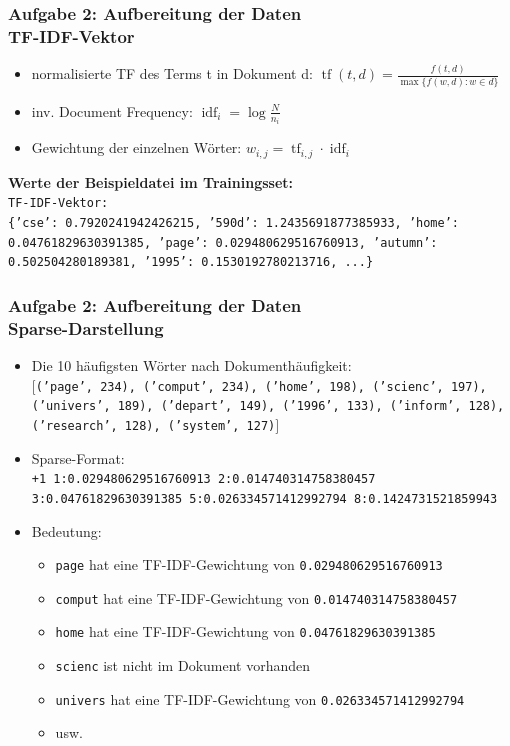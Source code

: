 \documentclass[accentcolor=tud7b,noresetcounter]{tudbeamer}
\begin{document}
	\begin{frame}
		\frametitle{Aufgabe 2: Aufbereitung der Daten\\TF-IDF-Vektor}
		\begin{itemize}
			\item normalisierte TF des Terms t in Dokument d: $\operatorname{tf}(t,d) = \frac{f(t, d)}{\max\{f(w, d):w \in d\}}$
			\item inv. Document Frequency: $\operatorname{idf}_i = \log \frac{N}{n_i}$
			\item Gewichtung der einzelnen Wörter: $w_{i,j} = \operatorname{tf}_{i,j} \cdot \operatorname{idf}_i$
		\end{itemize}
		
		\textbf{Werte der Beispieldatei im Trainingsset:}\\
		\texttt{TF-IDF-Vektor:}\\
		\texttt{\{'cse': 0.7920241942426215, '590d': 1.2435691877385933, 'home': 0.04761829630391385, 'page': 0.029480629516760913, 'autumn': 0.502504280189381, '1995': 0.1530192780213716, ...\}}
	\end{frame}
	
	\begin{frame}
		\frametitle{Aufgabe 2: Aufbereitung der Daten\\Sparse-Darstellung}
		\begin{itemize}
			\item Die 10 häufigsten Wörter nach Dokumenthäufigkeit:\\
			\texttt{$\lbrack$('page', 234), ('comput', 234), ('home', 198), ('scienc', 197), ('univers', 189), ('depart', 149), ('1996', 133), ('inform', 128), ('research', 128), ('system', 127)$\rbrack$}
			
			\item Sparse-Format:\\
			\texttt{+1 1:0.029480629516760913 2:0.014740314758380457 3:0.04761829630391385 5:0.026334571412992794 8:0.1424731521859943}
			\item Bedeutung:
			\begin{itemize}
 				\item \texttt{page} hat eine TF-IDF-Gewichtung von \texttt{0.029480629516760913}
 				\item \texttt{comput} hat eine TF-IDF-Gewichtung von \texttt{0.014740314758380457}
 				\item \texttt{home} hat eine TF-IDF-Gewichtung von \texttt{0.04761829630391385}
 				\item \texttt{scienc} ist nicht im Dokument vorhanden
 				\item \texttt{univers} hat eine TF-IDF-Gewichtung von \texttt{0.026334571412992794}
 				\item usw.
			\end{itemize}
		\end{itemize}
	\end{frame}
	
\end{document}
